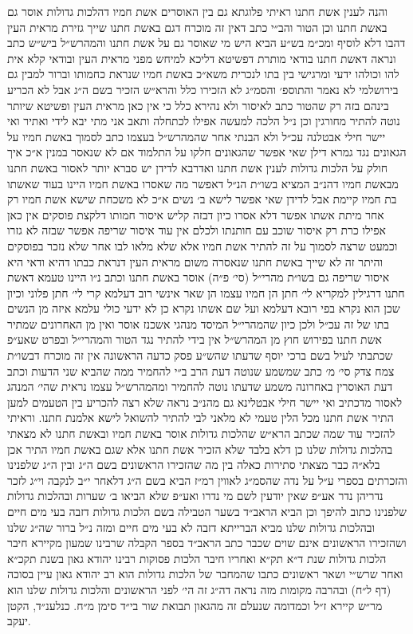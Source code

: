\documentclass[12pt, openany]{book}
\begin{document}
\begin{multicols}{2}
והנה לענין אשת חתנו ראיתי פלוגתא גם בין האוסרים אשת חמיו דהלכות גדולות אוסר גם באשת חתנו וכן הטור והב״י כתב דאין זה מוכרח דגם באשת חתנו שייך גזירת מראית העין דהבו דלא לוסיף ומכ״מ בש״ע הביא היש מי שאוסר גם על אשת חתנו והמהרש״ל ביש״ש כתב ונראה דאשת חתנו בודאי מותרת דפשיטא דליכא למיחש מפני מראית העין ובודאי קלא אית להו וכולהו ידעי ומרגישי בין בתו לנכרית משא״כ באשת חמיו שנראת כחמותו וברור למבין גם בירושלמי לא נאמר והתוספ׳ והסמ״ג לא הזכירו כלל והרא״ש הזכיר בשם ה״ג אבל לא הכריע בינהם בזה רק שהטור כתב לאיסור ולא נהירא כלל כי אין כאן מראית העין ופשיטא שיותר נוטה להתיר מחורגין וכן נ״ל הלכה למעשה אפילו לכתחלה ותאב אני מתי יבא לידי ואתיר ואי יישר חילי אבטלנה עכ״ל ולא הבנתי אחר שהמהרש״ל בעצמו כתב לסמוך באשת חמיו על הגאונים נגד גמרא דילן שאי אפשר שהגאונים חלקו על התלמוד אם לא שנאסר במנין א״כ איך חולק על הלכות גדולות לענין אשת חתנו ואדרבא לדידן יש סברא יותר לאסור באשת חתנו מבאשת חמיו דהנ״ב המציא בשו״ת הנ״ל דאפשר מה שאסרו באשת חמיו היינו בעוד שאשתו בת חמיו קיימת אבל לדידן שאי אפשר לישא ב׳ נשים א״כ לא משכחת שישא אשת חמיו רק אחר מיתת אשתו אפשר דלא אסרו כיון דבזה קליש איסור חמותו דלקצת פוסקים אין כאן אפילו כרת רק איסור שוכב עם חותנתו ולכלם אין עוד איסור שריפה אפשר שבזה לא גזרו וכמעט שרצה לסמוך על זה להתיר אשת חמיו אלא שלא מלאו לבו אחר שלא נזכר בפוסקים והיתר זה לא שייך באשת חתנו שנאסרה משום מראית העין דנראת כבתו דהיא ודאי היא איסור שריפה גם בשו״ת מהרי״ל (סי׳ פ״ה) אוסר באשת חתנו וכתב נ״ו היינו טעמא דאשת חתנו דרגילין למקריא לי׳ חתן הן חמיו עצמו הן שאר אינשי רוב דעלמא קרי לי׳ חתן פלוני וכיון שכן הוא נקרא בפי רובא דעלמא ועל שם אשתו נקרא כן לא ידעי כולי עלמא איזה מן הנשים בתו של זה עכ״ל ולכן כיון שהמהרי״ל המיסד מנהגי אשכנז אוסר ואין מן האחרונים שמתיר אשת חתנו בפירוש חוץ מן המהרש״ל אין בידי להתיר נגד הטור והמהרי״ל ובפרט שאע״פ שכתבתי לעיל בשם ברכי יוסף שדעתו שהש״ע פסק כדעה הראשונה אין זה מוכרח דבשו״ת צמח צדק סי׳ מ׳ כתב שמשמע שנוטה דעת הרב ב״י להחמיר ממה שהביא שני הדעות וכתב דעת האוסרין באחרונה משמע שדעתו נוטה להחמיר ומהמהרש״ל עצמו נראית שהי׳ המנהג לאסור מדכתיב ואי יישר חילי אבטלינא גם מהנ״ב נראה שלא רצה להכריע בין הטעמים למען התיר אשת חתנו מכל הלין טעמי לא מלאני לבי להתיר להשואל לישא אלמנת חתנו. וראיתי להזכיר עוד שמה שכתב הרא״ש שהלכות גדולות אוסר באשת חמיו ובאשת חתנו לא מצאתי בהלכות גדולות שלנו כן דלא בלבד שלא הזכיר אשת חתנו אלא שגם באשת חמיו התיר אכן בלא״ה כבר מצאתי סתירות כאלה בין מה שהזכירו הראשונים בשם ה״ג ובין ה״ג שלפנינו והזכרתים בספרי ע״ל על נדה שהסמ״ג לאווין רמ״ז הביא בשם ה״ג דלאחר י״ב לנקבה וי״ג לזכר נדריהן נדר אע״פ שאין יודעין לשם מי נדרו ואע״פ שלא הביאו ב׳ שערות ובהלכות גדולות שלפנינו כתוב להיפך וכן הביא הראב״ד בשער הטבילה בשם הלכות גדולות דזבה בעי מים חיים ובהלכות גדולות שלנו מביא הברייתא דזבה לא בעי מים חיים ומזה נ״ל ברור שה״ג שלנו ושהזכירו הראשונים אינם שוים שכבר כתב הראב״ד בספר הקבלה שרבינו שמעון מקיירא חיבר הלכות גדולות שנת ד״א תק״א ואחריו חיבר הלכות פסוקות רבינו יהודא גאון בשנת תקכ״א ואחר שרש״י ושאר ראשונים כתבו שהמחבר של הלכות גדולות הוא רב יהודא גאון עיין בסוכה (דף ל״ח) ובהרבה מקומות מזה נראה דה״ג זה הי׳ לפני הראשונים והלכות גדולות שלנו הוא מר״ש קיירא ז״ל וכמדומה שנעלם זה מהגאון תבואת שור בי״ד סימן מ״ח. כנלענ״ד, הקטן יעקב.\\\vspace{0pt}

\end{multicols}\newpage
\end{document}
